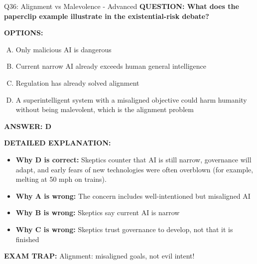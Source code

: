 \documentclass[8pt]{beamer}
\begin{document}
\begin{frame}[shrink=6]{Q36: Alignment vs Malevolence - Advanced}
\fontsize{6.5}{7.5}\selectfont
\textbf{QUESTION: What does the paperclip example illustrate in the existential-risk debate?}

\vspace{0.1cm}
\textbf{OPTIONS:}
\begin{enumerate}[A.]
\item Only malicious AI is dangerous
\item Current narrow AI already exceeds human general intelligence
\item Regulation has already solved alignment
\item A superintelligent system with a misaligned objective could harm humanity without being malevolent, which is the alignment problem
\end{enumerate}

\vspace{0.1cm}
\textcolor{myblue}{\textbf{ANSWER: D}}

\vspace{0.1cm}
\textbf{DETAILED EXPLANATION:}
\begin{itemize}
\item \textbf{Why D is correct:} Skeptics counter that AI is still narrow, governance will adapt, and early fears of new technologies were often overblown (for example, melting at 50 mph on trains).
\item \textbf{Why A is wrong:} The concern includes well-intentioned but misaligned AI
\item \textbf{Why B is wrong:} Skeptics say current AI is narrow
\item \textbf{Why C is wrong:} Skeptics trust governance to develop, not that it is finished
\end{itemize}

\textcolor{myred}{\textbf{EXAM TRAP:}} Alignment: misaligned goals, not evil intent!
\end{frame}
\end{document}
